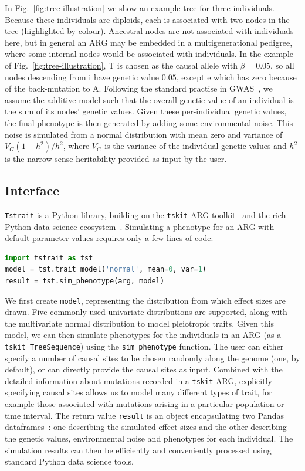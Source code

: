 \documentclass[unnumsec,webpdf,modern,large,namedate]{oup-authoring-template}%
\begin{document}
In Fig.~\ref{fig:tree-illustration} we show an example
tree for three individuals.
Because these individuals are diploids, each is associated
with two nodes in the tree (highlighted by colour).
Ancestral nodes are not associated with individuals here,
but in general an ARG may be embedded in a multigenerational
pedigree, where some internal nodes would be associated
with individuals.
In the example of
Fig.~\ref{fig:tree-illustration}, T is chosen as the causal
allele with $\beta=0.05$,
so all nodes descending from \textsf{i}
have genetic value $0.05$, except \textsf{e} which
has zero because of the back-mutation to A.
Following the standard practise in GWAS~\citep{uffelmann2021},
we assume the additive model such that the overall
genetic value of an individual is the sum of its
nodes' genetic values.
Given these per-individual genetic values, the final phenotype
is then generated by adding some environmental noise.
This noise is simulated from a normal distribution with mean zero
and variance of $V_G(1-h^2)/{h^2}$,
where $V_G$ is the variance of the individual genetic values
and $h^2$ is the narrow-sense heritability provided as input by the user.

\subsection{Interface}
\texttt{Tstrait} is a Python library, building on the \texttt{tskit}
ARG toolkit~\citep{ralph2020,wong2023general} and the rich
Python data-science ecosystem~\citep{numpy}.
Simulating a phenotype for an ARG with default parameter
values requires only a few lines of code:
\begin{lstlisting}[language=Python,aboveskip=1em,belowskip=1em]
import tstrait as tst
model = tst.trait_model('normal', mean=0, var=1)
result = tst.sim_phenotype(arg, model)
\end{lstlisting}
We first create \texttt{model}, representing the distribution
from which effect sizes are drawn. Five commonly used
univariate distributions are supported, along with the
multivariate normal distribution to model pleiotropic traits.
Given this model, we can then simulate phenotypes for the individuals
in an ARG (as a  \texttt{tskit TreeSequence}) using the
\texttt{sim\_phenotype} function.
The user can either specify a number of causal sites to be chosen randomly
along the genome (one, by default), or can directly provide the causal
sites as input. Combined with the detailed information about
mutations recorded in a \texttt{tskit} ARG, explicitly specifying causal
sites allows us to model many different types of trait, for example
those associated with mutations arising in a particular population
or time interval.
The return value \texttt{result} is an object encapsulating
two Pandas dataframes~\citep{mckinney2010data}: one describing the simulated
effect sizes and the other describing the genetic values,
environmental noise and phenotypes for each individual.
The simulation results can then be efficiently and conveniently
processed using standard Python data science tools.
\end{document}

